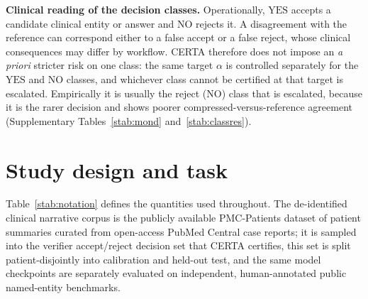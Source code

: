 \documentclass[11pt]{article}
\theoremstyle{plain}
\newcommand{\YES}{\mathrm{YES}}
\newcommand{\NO}{\mathrm{NO}}
\begin{document}
\vspace{0.6em}
\noindent\textbf{Clinical reading of the decision classes.} Operationally, $\YES$ accepts a candidate
clinical entity or answer and $\NO$ rejects it. A disagreement with the reference can correspond either
to a false accept or a false reject, whose clinical consequences may differ by workflow. CERTA
therefore does not impose an \emph{a priori} stricter risk on one class: the same target $\alpha$ is
controlled separately for the $\YES$ and $\NO$ classes, and whichever class cannot be certified at that
target is escalated. Empirically it is usually the reject ($\NO$) class that is escalated, because it is
the rarer decision and shows poorer compressed-versus-reference agreement (Supplementary
Tables~\ref{stab:mond} and~\ref{stab:classres}).

\tableofcontents
\vspace{1em}

\section{Study design and task}
Table~\ref{stab:notation} defines the quantities used throughout. The de-identified clinical narrative
corpus is the publicly available PMC-Patients dataset of patient summaries curated from open-access
PubMed Central case reports; it is sampled into the verifier accept/reject decision set that CERTA
certifies, this set is split patient-disjointly into calibration and held-out test, and the same model
checkpoints are separately evaluated on independent, human-annotated public named-entity benchmarks.
\end{document}
